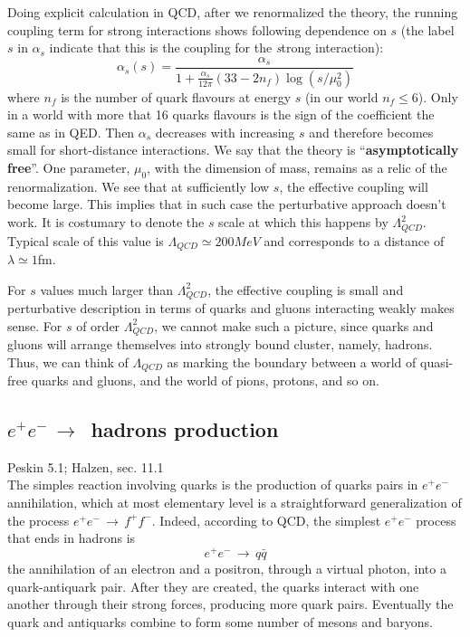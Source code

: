 \documentclass[TheoreticalPhy_ModB.tex]{subfiles}
\begin{document}
Doing explicit calculation in QCD, after we renormalized the theory, the running coupling term for strong interactions shows following dependence on $s$ (the label $s$ in $\alpha_s$ indicate that this is the coupling for the \emph{s}trong interaction):
\[\alpha_s(s)=\frac{\alpha_s}{1+\frac{\alpha_s}{12\pi}(33-2n_f)\log(s/\mu_0^2)}\]
where $n_f$ is the number of quark flavours at energy $s$ (in our world $n_f\leq6$). Only in a world with more that 16 quarks flavours is the sign of the coefficient the same as in QED. Then $\alpha_s$ decreases with increasing $s$ and therefore becomes small for short-distance interactions. We say that the theory is ``\textbf{asymptotically free}''.
One parameter, $\mu_0$, with the dimension of mass, remains as a relic of the renormalization. We see that at sufficiently low $s$, the effective coupling will become large. This implies that in such case the perturbative approach doesn't work. It is costumary to denote the $s$ scale at which this happens by $\Lambda_{QCD}^2$. Typical scale of this value is $\Lambda_{QCD}\simeq200MeV$ and corresponds to a distance of $\lambda \simeq1$fm.

For $s$ values much larger than  $\Lambda_{QCD}^2$, the effective coupling is small and perturbative description in terms of quarks and gluons interacting weakly makes sense. For $s$ of order $\Lambda_{QCD}^2$, we cannot make such a picture, since quarks and gluons will arrange themselves into strongly bound cluster, namely, hadrons. Thus, we can think of $\Lambda_{QCD}$ as marking the boundary between a world of quasi-free quarks and gluons, and the world of pions, protons, and so on. 

\subsection{$e^+e^-\,\rightarrow\,$ hadrons production}
\textsf{Peskin 5.1; Halzen, sec. 11.1}\\

The simples reaction involving quarks is the production of quarks pairs in $e^+e^-$ annihilation, which at most elementary level is a straightforward generalization of the process $e^+e^-\,\rightarrow\,f^+f^-$. Indeed, according to QCD, the simplest $e^+e^-$ process that ends in hadrons is 
\[e^+e^-\,\rightarrow\,q\bar q\]
the annihilation of an electron and a positron, through a virtual photon, into a quark-antiquark pair. After they are created, the quarks interact with one another through their strong forces, producing more quark pairs. Eventually the quark and antiquarks combine to form some number of mesons and baryons. 
\end{document}

